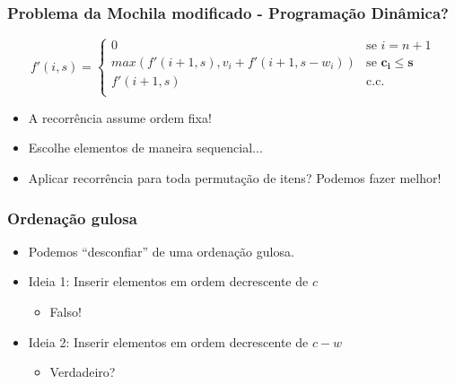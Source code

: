 \documentclass{beamer}
\begin{document}

\begin{frame}
\frametitle{Problema da Mochila modificado - Programação Dinâmica?}

\begin{equation}
  f'(i, s) =
  \begin{cases}
  0                                                             & \text{se $i = n + 1$} \\
  max(f'(i + 1, s), v_i + f'(i + 1, s - w_i))   & \text{se $\boldsymbol{c_i \leq s}$} \\
  f'(i + 1, s)                                          & \text{c.c.} \\
  \end{cases}
\end{equation}

\begin{itemize}
\item A recorrência assume ordem fixa!
\item Escolhe elementos de maneira sequencial...
\item Aplicar recorrência para toda permutação de itens? Podemos fazer melhor!
\end{itemize}

\end{frame}


\begin{frame}
\frametitle{Ordenação gulosa}

\begin{itemize}
\item Podemos ``desconfiar'' de uma ordenação gulosa.
\item Ideia 1: Inserir elementos em ordem decrescente de $c$
    \begin{itemize}
    \item Falso!
    \end{itemize}
\item Ideia 2: Inserir elementos em ordem decrescente de $c - w$
    \begin{itemize}
    \item Verdadeiro?
    \end{itemize}
\end{itemize}

\end{frame}

\end{document}
